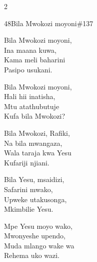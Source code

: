 \documentclass{article}
\begin{document}
\begin{multicols}{2}
\begin{hymn}{48}{Bila Mwokozi moyoni}{\#137}
\begin{stanza}
Bila Mwokozi moyoni,\\
Ina maana kuwa,\\
Kama meli baharini\\
Pasipo usukani.
\end{stanza}
\begin{chorus}
Bila Mwokozi moyoni,\\
Hali hii inatisha,\\
Mtu atathubutuje\\
Kufa bila Mwokozi?
\end{chorus}
\begin{stanza}
Bila Mwokozi, Rafiki,\\
Na bila mwangaza,\\
Wala taraja kwa Yesu\\
Kufariji njiani.
\end{stanza}
\begin{stanza}
Bila Yesu, msaidizi,\\
Safarini mwako,\\
Upweke utakusonga,\\
Mkimbilie Yesu.
\end{stanza}
\begin{stanza}
Mpe Yesu moyo wako,\\
Mwonyeshe upendo,\\
Muda mlango wake wa\\
Rehema uko wazi.
\end{stanza}
\end{hymn}


\end{multicols}
\end{document}
